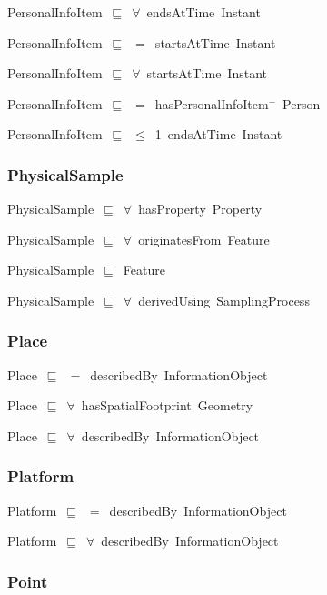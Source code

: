 \documentclass{article}
\begin{document}
PersonalInfoItem~\ensuremath{\sqsubseteq}~\ensuremath{\forall}~endsAtTime~Instant~

PersonalInfoItem~\ensuremath{\sqsubseteq}~\ensuremath{=}~startsAtTime~Instant~

PersonalInfoItem~\ensuremath{\sqsubseteq}~\ensuremath{\forall}~startsAtTime~Instant~

PersonalInfoItem~\ensuremath{\sqsubseteq}~\ensuremath{=}~hasPersonalInfoItem\ensuremath{^-}~Person~

PersonalInfoItem~\ensuremath{\sqsubseteq}~\ensuremath{\leq}~1~endsAtTime~Instant~

\subsubsection*{PhysicalSample}

PhysicalSample~\ensuremath{\sqsubseteq}~\ensuremath{\forall}~hasProperty~Property~

PhysicalSample~\ensuremath{\sqsubseteq}~\ensuremath{\forall}~originatesFrom~Feature~

PhysicalSample~\ensuremath{\sqsubseteq}~Feature~

PhysicalSample~\ensuremath{\sqsubseteq}~\ensuremath{\forall}~derivedUsing~SamplingProcess~

\subsubsection*{Place}

Place~\ensuremath{\sqsubseteq}~\ensuremath{=}~describedBy~InformationObject~

Place~\ensuremath{\sqsubseteq}~\ensuremath{\forall}~hasSpatialFootprint~Geometry~

Place~\ensuremath{\sqsubseteq}~\ensuremath{\forall}~describedBy~InformationObject~

\subsubsection*{Platform}

Platform~\ensuremath{\sqsubseteq}~\ensuremath{=}~describedBy~InformationObject~

Platform~\ensuremath{\sqsubseteq}~\ensuremath{\forall}~describedBy~InformationObject~

\subsubsection*{Point}
\end{document}
